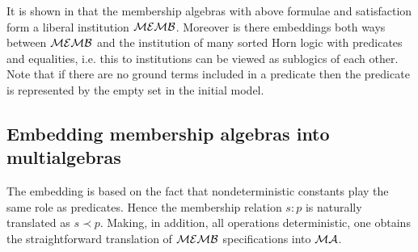 \documentclass[10pt]{article}
\begin{document}
%
It is shown in \cite{member} that the membership algebras with above formulae
and satisfaction form a liberal
institution ${\mathcal{MEMB}}$. Moreover is there embeddings both ways between ${\mathcal{MEMB}}$ and the institution of many sorted Horn logic with predicates and equalities, i.e. this to institutions can be viewed as sublogics of each other. Note that if there are no ground terms included in a
predicate then the predicate is represented by the empty set in the initial
model.

\subsection{Embedding membership algebras into multialgebras}\label{sub:mamb}
%
The embedding is based on the fact that nondeterministic constants play the
same role as predicates. Hence the membership relation $s:p$ is naturally
translated as $s\prec p$. Making, in addition, all operations deterministic,
one obtains the straightforward translation of ${\mathcal{MEMB}}$ specifications
into ${\mathcal{MA}}$.
\end{document}
